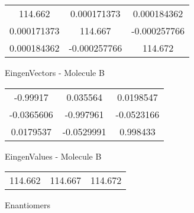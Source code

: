 \begin{multicols}{2}
\begin{center}
\begin{tabular}{|c c c|}
114.662	 & 	0.000171373	 & 	0.000184362	 \\
0.000171373	 & 	114.667	 & 	-0.000257766	 \\
0.000184362	 & 	-0.000257766	 & 	114.672
\end{tabular}

\vtab
 EingenVectors - Molecule B     \\
\vtab
\begin{tabular}{|c c c|}
-0.99917	 & 	0.035564	 & 	0.0198547	 \\
-0.0365606	 & 	-0.997961	 & 	-0.0523166	 \\
0.0179537	 & 	-0.0529991	 & 	0.998433
\end{tabular}

\vtab
 EingenValues - Molecule B     \\
\vtab
\begin{tabular}{|c c c|}
114.662	 & 	114.667	 & 	114.672	 \\
\end{tabular}

\end{center}
\end{multicols}
\begin{center}
\vtab
\vtab
\textcolor{NavyBlue}{\Large Enantiomers}
\end{center}

 \newpage

